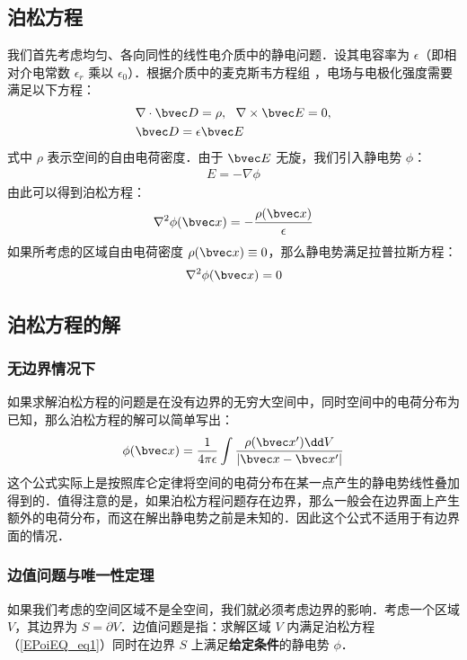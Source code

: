 

\subsection{泊松方程}
我们首先考虑均匀、各向同性的线性电介质中的静电问题．设其电容率为 $\epsilon$（即相对介电常数 $\epsilon_r$ 乘以 $\epsilon_0$）．根据介质中的麦克斯韦方程组 ，电场与电极化强度需要满足以下方程：
\begin{align}
&\nabla \cdot \bvec D = \rho,\ \ \nabla \times \bvec E = 0,\\
&\bvec D=\epsilon \bvec E
\end{align}
式中 $\rho$ 表示空间的自由电荷密度．由于 $\bvec E$ 无旋，我们引入静电势 $\phi$：
\begin{align}
E=-\nabla \phi
\end{align}
由此可以得到泊松方程：
\begin{align}
\nabla^2 \phi(\bvec x)=-\frac{\rho(\bvec x)}{\epsilon} \label{EPoiEQ_eq1}
\end{align}
如果所考虑的区域自由电荷密度 $\rho(\bvec x)\equiv 0$，那么静电势满足拉普拉斯方程：
\begin{align}
\nabla^2 \phi(\bvec x)=0
\end{align}

\subsection{泊松方程的解}
\subsubsection{无边界情况下}
如果求解泊松方程的问题是在没有边界的无穷大空间中，同时空间中的电荷分布为已知，那么泊松方程的解可以简单写出：
\begin{align}
\phi(\bvec x)=\frac{1}{4\pi \epsilon}\int \frac{\rho (\bvec x')\dd V}{|\bvec x-\bvec x'|}
\end{align}
这个公式实际上是按照库仑定律将空间的电荷分布在某一点产生的静电势线性叠加得到的．值得注意的是，如果泊松方程问题存在边界，那么一般会在边界面上产生额外的电荷分布，而这在解出静电势之前是未知的．因此这个公式不适用于有边界面的情况．
\subsubsection{边值问题与唯一性定理}
如果我们考虑的空间区域不是全空间，我们就必须考虑边界的影响．考虑一个区域 $V$，其边界为 $S=\partial V$．边值问题是指：求解区域 $V$ 内满足泊松方程（\autoref{EPoiEQ_eq1}）同时在边界 $S$ 上满足\textbf{给定条件}的静电势 $\phi$．

